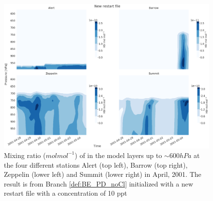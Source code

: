 \begin{figure}[ht]
    \centering
    \includegraphics[width=\linewidth]{Chapter6_Results/images/vertHBr_newRestart.png}
    \caption{Mixing ratio ($mol mol^{-1}$) of  in the model layers up to $\sim 600 hPa$ at the four different stations Alert (top left), Barrow (top right), Zeppelin (lower left) and Summit (lower right) in April, 2001. The result is from Branch \ref{def:BE_PD_noCl} initialized with a new restart file with a  concentration of 10 ppt}
    \label{fig:vertHBr_newRestart}
\end{figure}